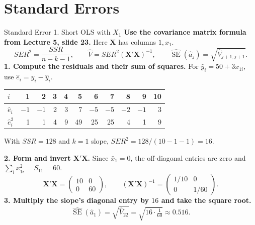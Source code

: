 \documentclass[10pt,aspectratio=169]{beamer}
\newcommand{\SE}{\operatorname{SE}}
\begin{document}
\section{Standard Errors}

\begin{frame}{Standard Error 1. Short OLS with $X_1$}
\small
\setlength{\abovedisplayskip}{5pt}
\setlength{\belowdisplayskip}{5pt}
\textbf{Use the covariance matrix formula from Lecture 5, slide 23.}
Here $\mathbf X$ has columns $1,x_1$.
\[
SER^2=\frac{SSR}{n-k-1},\qquad
\widehat V=SER^2(\mathbf X'\mathbf X)^{-1},\qquad
\widehat{\SE}(\hat a_j)=\sqrt{\widehat V_{j+1,j+1}}.
\]
\textbf{1. Compute the residuals and their sum of squares.}
For $\hat y_i=50+3x_{1i}$, use $\hat e_i=y_i-\hat y_i$.
\begin{center}
\begin{tabular}{lrrrrrrrrrr}
\toprule
$i$ & 1&2&3&4&5&6&7&8&9&10\\
\midrule
$\hat e_i$ & $-1$ & $-1$ & 2 & 3 & 7 & $-5$ & $-5$ & $-2$ & $-1$ & 3\\
$\hat e_i^2$ & 1 & 1 & 4 & 9 & 49 & 25 & 25 & 4 & 1 & 9\\
\bottomrule
\end{tabular}
\end{center}
With $SSR=128$ and $k=1$ slope, $SER^2=128/(10-1-1)=16$.
\smallskip

\textbf{2. Form and invert $\mathbf X'\mathbf X$.}
Since $\bar x_1=0$, the off-diagonal entries are zero and $\sum_i x_{1i}^2=S_{11}=60$.
\[
\mathbf X'\mathbf X=\begin{pmatrix}10&0\\0&60\end{pmatrix},
\qquad
(\mathbf X'\mathbf X)^{-1}=\begin{pmatrix}1/10&0\\0&1/60\end{pmatrix}.
\]
\textbf{3. Multiply the slope's diagonal entry by $16$ and take the square root.}
\[
\boxed{\widehat{\SE}(\hat a_1)=\sqrt{\widehat V_{22}}
=\sqrt{16\cdot\tfrac1{60}}\approx0.516.}
\]
\end{frame}
\end{document}
